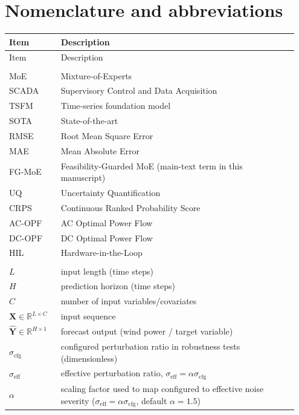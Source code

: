\documentclass[review,1p,times]{elsarticle}
\begin{document}
\section{Nomenclature and abbreviations}
\begingroup
\footnotesize
\setlength{\tabcolsep}{3pt}
\renewcommand{\arraystretch}{0.92}
\noindent
\nolinenumbers
\begin{longtable}{@{}p{0.17\linewidth}L{0.78\linewidth}@{}}
\toprule
Item & Description \\
\midrule
\endfirsthead
\toprule
Item & Description \\
\midrule
\endhead
\bottomrule
\endlastfoot
{} \\
MoE & Mixture-of-Experts \\
SCADA & Supervisory Control and Data Acquisition \\
TSFM & Time-series foundation model \\
SOTA & State-of-the-art \\
RMSE & Root Mean Square Error \\
MAE & Mean Absolute Error \\
FG-MoE & Feasibility-Guarded MoE (main-text term in this manuscript) \\
UQ & Uncertainty Quantification \\
CRPS & Continuous Ranked Probability Score \\
AC-OPF & AC Optimal Power Flow \\
DC-OPF & DC Optimal Power Flow \\
HIL & Hardware-in-the-Loop \\
\addlinespace[2pt]
 \\
$L$ & input length (time steps) \\
$H$ & prediction horizon (time steps) \\
$C$ & number of input variables/covariates \\
$\mathbf{X}\in\mathbb{R}^{L\times C}$ & input sequence \\
$\hat{\mathbf{Y}}\in\mathbb{R}^{H\times 1}$ & forecast output (wind power / target variable) \\
$\sigma_{\mathrm{cfg}}$ & configured perturbation ratio in robustness tests (dimensionless) \\
$\sigma_{\mathrm{eff}}$ & effective perturbation ratio, $\sigma_{\mathrm{eff}}=\alpha\sigma_{\mathrm{cfg}}$ \\
$\alpha$ & scaling factor used to map configured to effective noise severity ($\sigma_{\mathrm{eff}}=\alpha\sigma_{\mathrm{cfg}}$, default $\alpha=1.5$) \\

\end{longtable}
\end{document}
